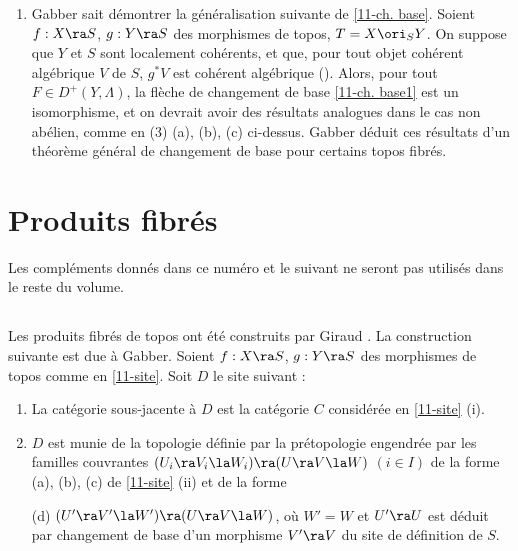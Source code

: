 \documentclass[10pt]{../fichiers-configuration-latex/smfart}
\begin{document}
\begin{remarques}
\begin{enumerate}
\begin{itemize}
\item[(c)] Plus généralement, pour tout champ $F$ sur $Y$, la flèche de changement de base $$ f^*g_*F \ra
p_1{}_*p_2^*F $$ est une équivalence.

\end{itemize}

La vérification de (b) et (c) semble requérir, outre les techniques de réduction des champs aux
gerbes de \cite[III 2.1.5]{CNA@Giraud}, des résultats de passage à la limite pour la cohomologie non
abélienne analogues à ceux de , pour lesquels nous ne connaissons pas de référence.

\item Gabber sait démontrer la généralisation suivante de \ref{11-ch. base}. Soient $f : X
\ra S$, $g : Y \ra S$ des morphismes de topos, $T = X \ori_S Y$. On suppose que $Y$ et $S$ sont
localement cohérents, et que, pour tout objet cohérent algébrique $V$ de $S$, $g^*V$ est cohérent
algébrique (). Alors, pour tout $F \in D^+(Y,\Lambda)$, la flèche de changement de
base \ref{11-ch. base1} est un isomorphisme, et on devrait avoir des résultats analogues dans le cas
non abélien, comme en (3) (a), (b), (c) ci-dessus. Gabber déduit ces résultats d'un théorème général
de changement de base pour certains topos fibrés.
\end{enumerate}
\end{remarques}

\section{Produits fibrés} Les compléments donnés
dans ce numéro et le suivant ne seront pas utilisés dans le reste du volume.

\subsection{}\label{11-site produit fibré} Les produits fibrés de topos ont été construits par
Giraud \cite[3.4]{classtop@Giraud}. La construction suivante est due à Gabber. Soient $f : X \ra S$,
$g : Y \ra S$ des morphismes de topos comme en \ref{11-site}. Soit $D$ le site suivant :

\renewcommand{\theenumi}{(\roman{enumi})}
\begin{enumerate}
\item La catégorie sous-jacente à $D$ est la catégorie $C$ considérée en \ref{11-site} (i). 

\item $D$ est munie de la topologie définie par la prétopologie engendrée par les familles couvrantes
$(U_i \ra V_i \la W_i) \ra (U \ra V \la W)$ $(i \in I)$ de la forme (a), (b), (c) de \ref{11-site}
(ii) et de la forme

(d) $(U' \ra V' \la W') \ra (U \ra V \la W)$, où $W' = W$ et $U' \ra U$ est déduit par changement de
base d'un morphisme $V' \ra V$ du site de définition de $S$.
\end{enumerate}
\end{document}

